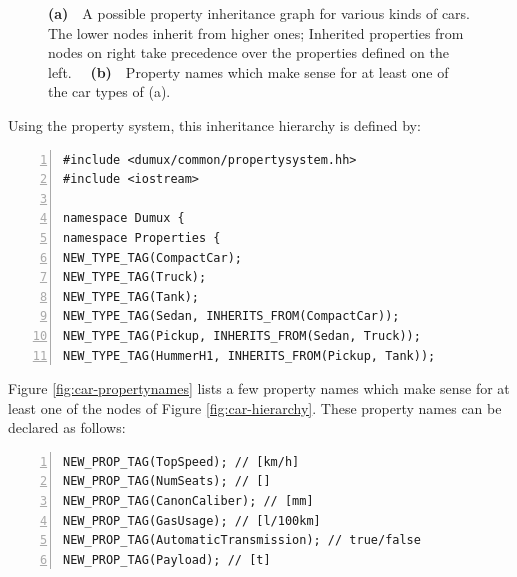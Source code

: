 \begin{figure}[t]
  \centering 
  \caption{ \textbf{(a)}~~A possible property inheritance graph for
    various kinds of cars.  The lower nodes inherit from higher ones;
    Inherited properties from nodes on right take precedence over the
    properties defined on the left. ~~\textbf{(b)}~~Property names
    which make sense for at least one of the car types of (a).  }
\end{figure}

Using the \Dumux property system, this inheritance hierarchy is
defined by:
\begin{lstlisting}[name=propsyscars,basicstyle=\ttfamily\scriptsize,numbers=left,numberstyle=\tiny, numbersep=5pt]
#include <dumux/common/propertysystem.hh>
#include <iostream>

namespace Dumux {
namespace Properties {
NEW_TYPE_TAG(CompactCar);
NEW_TYPE_TAG(Truck);
NEW_TYPE_TAG(Tank);
NEW_TYPE_TAG(Sedan, INHERITS_FROM(CompactCar));
NEW_TYPE_TAG(Pickup, INHERITS_FROM(Sedan, Truck));
NEW_TYPE_TAG(HummerH1, INHERITS_FROM(Pickup, Tank));
\end{lstlisting}

Figure \ref{fig:car-propertynames} lists a few property names which
make sense for at least one of the nodes of Figure
\ref{fig:car-hierarchy}. These property names can be declared as
follows:
\begin{lstlisting}[name=propsyscars,basicstyle=\ttfamily\scriptsize,numbers=left,numberstyle=\tiny, numbersep=5pt]
NEW_PROP_TAG(TopSpeed); // [km/h]
NEW_PROP_TAG(NumSeats); // []
NEW_PROP_TAG(CanonCaliber); // [mm]
NEW_PROP_TAG(GasUsage); // [l/100km]
NEW_PROP_TAG(AutomaticTransmission); // true/false
NEW_PROP_TAG(Payload); // [t]
\end{lstlisting}

